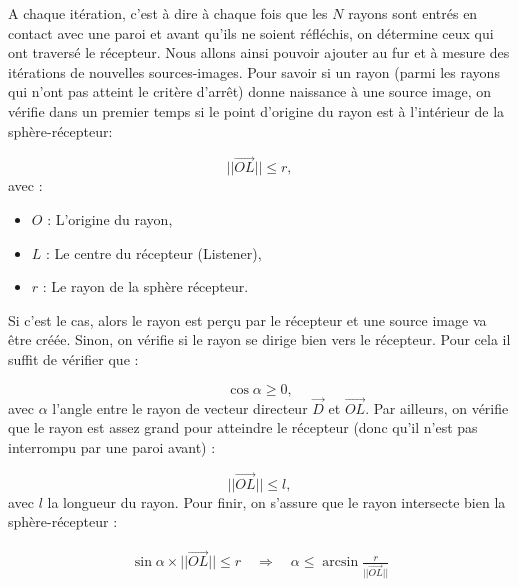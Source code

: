 A chaque itération, c'est à dire à chaque fois que les $N$ rayons sont entrés en contact avec une paroi et avant qu'ils ne soient réfléchis, on détermine ceux qui ont traversé le récepteur. Nous allons ainsi pouvoir ajouter au fur et à mesure des itérations de nouvelles sources-images. Pour savoir si un rayon (parmi les rayons qui n'ont pas atteint le critère d'arrêt) donne naissance à une source image, on vérifie dans un premier temps si le point d'origine du rayon est à l'intérieur de la sphère-récepteur:

\begin{equation}
||\overrightarrow{OL}|| \leqslant r,
\end{equation}
avec :
\begin{itemize}
\item$O$ : L'origine du rayon,
\item$L$ : Le centre du récepteur (Listener),
\item$r$ : Le rayon de la sphère récepteur.
\end{itemize}
%
Si c'est le cas, alors le rayon est perçu par le récepteur et une source image va être créée. Sinon, on vérifie si le rayon se dirige bien vers le récepteur. Pour cela il suffit de vérifier que :

\begin{equation}
\cos{\alpha} \geqslant 0,
\end{equation}
avec $\alpha$ l'angle entre le rayon de vecteur directeur $\overrightarrow{D}$ et $\overrightarrow{OL}$. Par ailleurs, on vérifie que le rayon est assez grand pour atteindre le récepteur (donc qu'il n'est pas interrompu par une paroi avant) :

\begin{equation}
||\overrightarrow{OL}|| \leqslant l,
\end{equation}
%
avec $l$ la longueur du rayon. Pour finir, on s'assure que le rayon intersecte bien la sphère-récepteur :

\begin{align}
\sin{\alpha} \times ||\overrightarrow{OL}||  \leqslant r 
\quad \Rightarrow \quad
\alpha  \leqslant \arcsin{\frac{r}{||\overrightarrow{OL}||}}
\end{align}

